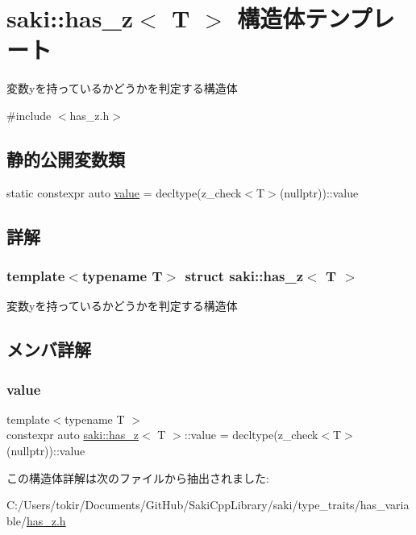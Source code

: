 \hypertarget{structsaki_1_1has__z}{}\section{saki\+:\+:has\+\_\+z$<$ T $>$ 構造体テンプレート}
\label{structsaki_1_1has__z}


変数yを持っているかどうかを判定する構造体  




{\ttfamily \#include $<$has\+\_\+z.\+h$>$}

\subsection*{静的公開変数類}
\begin{DoxyCompactItemize}
\item 
static constexpr auto \mbox{\hyperlink{structsaki_1_1has__z_a4abee363bc8a82bb0030300abba45ceb}{value}} = decltype(z\+\_\+check$<$T$>$(nullptr))\+::value
\end{DoxyCompactItemize}


\subsection{詳解}
\subsubsection*{template$<$typename T$>$\newline
struct saki\+::has\+\_\+z$<$ T $>$}

変数yを持っているかどうかを判定する構造体 

\subsection{メンバ詳解}
\mbox{\label{structsaki_1_1has__z_a4abee363bc8a82bb0030300abba45ceb}} 
\subsubsection{\texorpdfstring{value}{value}}
{\footnotesize\ttfamily template$<$typename T $>$ \\
constexpr auto \mbox{\hyperlink{structsaki_1_1has__z}{saki\+::has\+\_\+z}}$<$ T $>$\+::value = decltype(z\+\_\+check$<$T$>$(nullptr))\+::value\hspace{0.3cm}{\ttfamily [static]}}



この構造体詳解は次のファイルから抽出されました\+:\begin{DoxyCompactItemize}
\item 
C\+:/\+Users/tokir/\+Documents/\+Git\+Hub/\+Saki\+Cpp\+Library/saki/type\+\_\+traits/has\+\_\+variable/\mbox{\hyperlink{has__z_8h}{has\+\_\+z.\+h}}\end{DoxyCompactItemize}
